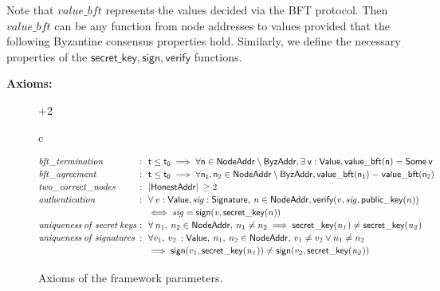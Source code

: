 \documentclass{article}
\begin{document}
\noindent Note that $\mathit{value\_bft}$ represents the values decided via the BFT protocol. Then $value\_bft$ can be any function from node addresses to values provided that the following Byzantine consensus properties hold. Similarly, we define the necessary properties of the $\mathsf{secret\_key}, \mathsf{sign}, \mathsf{verify}$ functions.
\vspace{2mm}

\noindent \textbf{Axioms:}
\vspace{2mm}

{
\begin{figure}[h]
\begin{varwidth}{\dimexpr\textwidth+2\fboxrule\relax}
\centering
{\small{
\begin{tabular}{c}
\begin{minipage}{0.44\linewidth}
{\small{
\[
\!\!\!
\begin{array}{l@{\ }c@{\ \ }l}
  \bfttermination & : & \tN \leq \tZero \implies \forall \mathsf{n} \in \NodeAddr \setminus \ByzAddr, \exists \: \mathsf{v} : \Value, \valuebft(\mathsf{n}) = \SomeV \: \mathsf{v}  \\[2pt]
  \bftagreement & : & \tN \leq \tZero \implies \forall \mathsf{n_1}, \mathsf{n_2} \in \NodeAddr \setminus \ByzAddr,  \valuebft(\mathsf{n_1}) = \valuebft(\mathsf{n_2}) \\[2pt]
  \twocorrectnodes & : & | \mathsf{HonestAddr} | \:  \geq 2 \\[2pt]
  \mathit{authentication} & : & \forall \: v : \Value, \mathit{sig} : \mathsf{Signature}, \: n \in \NodeAddr, 
  \mathsf{verify}(v, \mathit{sig}, \mathsf{public\_key}(n)) \\[2pt]
  & & \iff \mathit{sig} = \mathsf{sign}(\mathit{v}, \mathit{\mathsf{secret\_key}(\mathit{n})}) \\[2pt]
  \mathit{uniqueness \: of \: secret \: keys} & : & \forall \: n_{1}, \: n_{2} \in \NodeAddr, \: n_{1} \neq n_{2} \implies \mathsf{secret\_key}(\mathit{n_{1}}) \neq \mathsf{secret\_key}(\mathit{n_{2}}) \\[2pt]
  \mathit{uniqueness \: of \: signatures} & : & \forall v_{1}, \: v_{2} \: : \Value, \: n_{1}, \: n_{2} \in \NodeAddr, \: v_{1} \neq v_{2} \vee n_{1} \neq n_{2} \\[2pt]
  & & \implies \mathsf{sign}(v_{1}, \mathsf{secret\_key}(\mathit{n_{1}})) \neq \mathsf{sign}(v_{2}, \mathsf{secret\_key}(\mathit{n_{2}})) \\[2pt]
\end{array}
\]
}}
\end{minipage}
\end{tabular}
}}
\end{varwidth}
\caption{Axioms of the framework parameters.}
\label{fig:axioms}
\end{figure}
}
\end{document}

